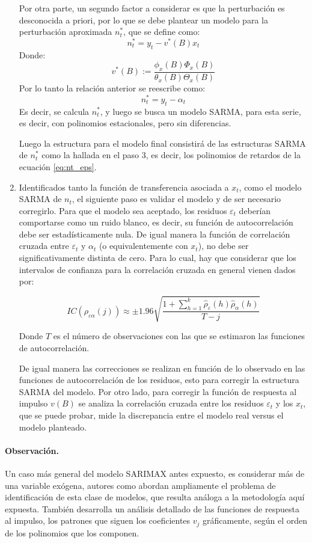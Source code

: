 \documentclass[12pt,oneside]{book}\usepackage[]{graphicx}\usepackage[]{color}
\theoremstyle{definition} %
\begin{document}
\begin{enumerate}
Por otra parte, un segundo factor a considerar es que la perturbación es desconocida a priori, por lo que se debe plantear un modelo para la perturbación aproximada $n_t^{*}$, que se define como:
$$n_t^{*} = y_t - v^{*}(B)x_t$$
Donde:
$$v^{*}(B):=\frac{ \phi_x(B) \Phi_x(B) }{\theta_x(B) \Theta_x(B)}$$
Por lo tanto la relación anterior se reescribe como:
$$n_t^{*} = y_t -\alpha_t$$
Es decir, se calcula $n_t^{*}$, y luego se busca un modelo SARMA, para esta serie, es decir, con polinomios estacionales, pero sin diferencias. 

Luego la estructura para el modelo final consistirá de las estructuras SARMA de $n_t^{*}$ como la hallada en el paso 3, es decir, los polinomios de retardos de la ecuación \ref{eq:nt_eps}.

\item Identificados tanto la función de transferencia asociada a $x_t$, como el modelo SARMA de $n_t$, el siguiente paso es validar el modelo y de ser necesario corregirlo. Para que el modelo sea aceptado, los residuos $\varepsilon_t$ deberían comportarse como un ruido blanco, es decir, su función de autocorrelación debe ser estadísticamente nula. De igual manera la función de correlación cruzada entre $\varepsilon_t$ y $\alpha_t$ (o equivalentemente con $x_t$), no debe ser significativamente distinta de cero. Para lo cual, hay que considerar que los intervalos de confianza para la correlación cruzada en general vienen dados por:

$$IC(\rho_{\varepsilon\alpha}(j) ) \approx \pm 1.96 \sqrt{ \frac{1+\sum_{h=1}^k \hat\rho_\varepsilon(h) \hat\rho_\alpha(h) }{T-j} } $$

Donde $T$ es el número de observaciones con las que se estimaron las funciones de autocorrelación.

De igual manera las correcciones se realizan en función de lo observado en las funciones de autocorrelación de los residuos, esto para corregir la estructura SARMA del modelo. Por otro lado, para corregir la función de respuesta al impulso $v(B)$ se analiza la correlación cruzada entre los residuos $\varepsilon_t$ y los $x_t$, que se puede probar, mide la discrepancia entre el modelo real versus el modelo planteado.

\end{enumerate}


\paragraph{Observación.} Un caso más general del modelo SARIMAX antes expuesto, es considerar más de una variable exógena, autores como \citeauthor{pankratz2012forecasting} \citeyear{pankratz2012forecasting} abordan ampliamente el problema de identificación de esta clase de modelos, que resulta análoga a la metodología aquí expuesta. También desarrolla un análisis detallado de las funciones de respuesta al impulso, los patrones que siguen los coeficientes $v_j$ gráficamente, según el orden de los polinomios que los componen.
\end{document}
